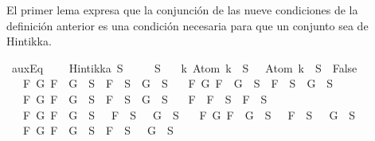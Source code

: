 \begin{isabellebody}
\begin{isamarkuptext}
  El primer lema expresa que la conjunción de las nueve condiciones de 
  la definición anterior es una condición necesaria para que un conjunto 
  sea de Hintikka.%
\end{isamarkuptext}\isamarkuptrue%
\isamarkupfalse%
\ auxEq{\isacharcolon}\ \isanewline
\ \ \ {\isachardoublequoteopen}Hintikka\ S{\isachardoublequoteclose}\isanewline
\ \ \ {\isachardoublequoteopen}{\isasymbottom}\ {\isasymnotin}\ S\isanewline
\ \ {\isasymand}\ {\isacharparenleft}{\isasymforall}k{\isachardot}\ Atom\ k\ {\isasymin}\ S\ {\isasymlongrightarrow}\ \isactrlbold {\isasymnot}\ {\isacharparenleft}Atom\ k{\isacharparenright}\ {\isasymin}\ S\ {\isasymlongrightarrow}\ False{\isacharparenright}\isanewline
\ \ {\isasymand}\ {\isacharparenleft}{\isasymforall}F\ G{\isachardot}\ F\ \isactrlbold {\isasymand}\ G\ {\isasymin}\ S\ {\isasymlongrightarrow}\ F\ {\isasymin}\ S\ {\isasymand}\ G\ {\isasymin}\ S{\isacharparenright}\isanewline
\ \ {\isasymand}\ {\isacharparenleft}{\isasymforall}F\ G{\isachardot}\ F\ \isactrlbold {\isasymor}\ G\ {\isasymin}\ S\ {\isasymlongrightarrow}\ F\ {\isasymin}\ S\ {\isasymor}\ G\ {\isasymin}\ S{\isacharparenright}\isanewline
\ \ {\isasymand}\ {\isacharparenleft}{\isasymforall}F\ G{\isachardot}\ F\ \isactrlbold {\isasymrightarrow}\ G\ {\isasymin}\ S\ {\isasymlongrightarrow}\ \isactrlbold {\isasymnot}F\ {\isasymin}\ S\ {\isasymor}\ G\ {\isasymin}\ S{\isacharparenright}\isanewline
\ \ {\isasymand}\ {\isacharparenleft}{\isasymforall}F{\isachardot}\ \isactrlbold {\isasymnot}\ {\isacharparenleft}\isactrlbold {\isasymnot}F{\isacharparenright}\ {\isasymin}\ S\ {\isasymlongrightarrow}\ F\ {\isasymin}\ S{\isacharparenright}\isanewline
\ \ {\isasymand}\ {\isacharparenleft}{\isasymforall}F\ G{\isachardot}\ \isactrlbold {\isasymnot}{\isacharparenleft}F\ \isactrlbold {\isasymand}\ G{\isacharparenright}\ {\isasymin}\ S\ {\isasymlongrightarrow}\ \isactrlbold {\isasymnot}\ F\ {\isasymin}\ S\ {\isasymor}\ \isactrlbold {\isasymnot}\ G\ {\isasymin}\ S{\isacharparenright}\isanewline
\ \ {\isasymand}\ {\isacharparenleft}{\isasymforall}F\ G{\isachardot}\ \isactrlbold {\isasymnot}{\isacharparenleft}F\ \isactrlbold {\isasymor}\ G{\isacharparenright}\ {\isasymin}\ S\ {\isasymlongrightarrow}\ \isactrlbold {\isasymnot}\ F\ {\isasymin}\ S\ {\isasymand}\ \isactrlbold {\isasymnot}\ G\ {\isasymin}\ S{\isacharparenright}\isanewline
\ \ {\isasymand}\ {\isacharparenleft}{\isasymforall}F\ G{\isachardot}\ \isactrlbold {\isasymnot}{\isacharparenleft}F\ \isactrlbold {\isasymrightarrow}\ G{\isacharparenright}\ {\isasymin}\ S\ {\isasymlongrightarrow}\ F\ {\isasymin}\ S\ {\isasymand}\ \isactrlbold {\isasymnot}\ G\ {\isasymin}\ S{\isacharparenright}{\isachardoublequoteclose}\isanewline

\end{isabellebody}
